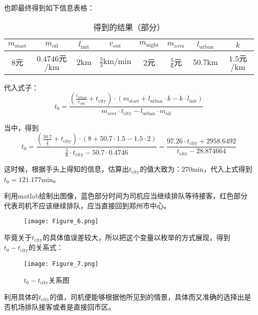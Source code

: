 \documentclass[withoutpreface,bwprint]{cumcmthesis} %
\begin{document}
也即最终得到如下信息表格：\par
\begin{table}[!htbp]
	\caption[标签名]{得到的结果（部分）}
	\begin{tabular}{c|c|c|c|c|c|c|c}
		\toprule[1.5pt]
		$m_{\mathrm{start}}$ & $m_{\mathrm{oil}}$       & $l_{\mathrm{init}}$ & $v_{\mathrm{out}}$            & $m_{\mathrm{night}}$ & $m_{\mathrm{aver}}$ & $l_{\mathrm{urban}}$ & $k$                    \\
		\midrule[1pt]
		8元                  & $0.4746$元$\mathrm{/km}$ & $2\mathrm{km}$      & $ \frac{5}{3}\mathrm{km/min}$ & $2$元                & $\frac{5}{6}$元     & $50.7\mathrm{km}$    & $ 1.5$元$\mathrm{/km}$ \\
		\bottomrule[1.5pt]
	\end{tabular}
\end{table}
代入式子：
$$
	t_0 = \frac{\left(\frac{l_{\mathrm{urban}}}{v_{\mathrm{out}}}+t_{\mathrm{city}}\right)\cdot \left(m_{\mathrm{start}}+ l_{\mathrm{urban}}\cdot k -k\cdot l_{\mathrm{init}} \right)}{ m_{\mathrm{aver}}\cdot t_{\mathrm{city}}-l_{\mathrm{urban}}\cdot m_{\mathrm{oil}}}
$$\par
当中，得到
$$
	t_0 = \frac{\left(\frac{50.7}{\frac{5}{3}}+t_{\mathrm{city}}\right)\cdot \left(8+50.7\cdot 1.5 -1.5\cdot 2 \right)}{ \frac{5}{6}\cdot t_{\mathrm{city}}-50.7\cdot 0.4746}=\frac{97.26\cdot t_{\mathrm{city}}+2958.6492}{ t_{\mathrm{city}} -28.874664}
$$\par
这时候，根据手头上得知的信息，估算出$ t_{\mathrm{city}}$的值大致为：$270\mathrm{min}$，代入上式得到$t_0=121.177\mathrm{min}$。\par
利用matlab绘制出图像，蓝色部分时间为司机应当继续排队等待接客，红色部分代表司机不应该继续排队，应当直接回到郑州市中心。\par
\begin{figure}[!h]
	\centering
	\texttt{[image: Figure\_6.png]}
	\caption{}
\end{figure}
\newpage
毕竟关于$ t_{\mathrm{city}}$的具体值误差较大，所以把这个变量以枚举的方式展现，得到$t_0 - t_{\mathrm{city}}$的关系式：\par
\begin{figure}[!h]
	\centering
	\texttt{[image: Figure\_7.png]}
	\caption{$t_0 - t_{\mathrm{city}}$关系图}
\end{figure}
利用具体的$t_{\mathrm{city}}$的值，司机便能够根据他所见到的情景，具体而又准确的选择出是否机场排队接客或者是直接回市区。\par
\end{document}
